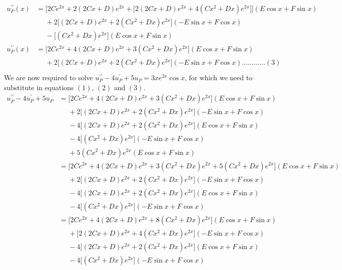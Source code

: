 \documentclass[a4paper]{article}
\newcommand{\ds}{\displaystyle}
\begin{document}
\begin{enumerate}
\begin{align*}
		u_P^{\prime\prime}(x) & = \Big[2Ce^{2x} + 2(2Cx+D)e^{2x} +\big[2(2Cx+D)e^{2x} + 4(Cx^2+Dx)e^{2x}\big] \Big](E\cos{x} + F\sin{x})\\
		& \phantom{{}={}} + 2\Big[(2Cx+D)e^{2x} + 2(Cx^2+Dx)e^{2x} \Big](-E\sin{x} + F\cos{x})\\
		& \phantom{{}={}} - \Big[(Cx^2+Dx)e^{2x} \Big](E\cos{x} + F\sin{x})\\
		u_P^{\prime\prime}(x) & = \Big[2Ce^{2x} + 4(2Cx+D)e^{2x} + 3(Cx^2+Dx)e^{2x} \Big](E\cos{x} + F\sin{x})\\
		& \phantom{{}={}} + 2\Big[(2Cx+D)e^{2x} + 2(Cx^2+Dx)e^{2x} \Big](-E\sin{x} + F\cos{x})\dots\dots\dots\dots(3)\\
	\end{align*}
	\pagebreak
	We are now required to solve $\ds{u_P^{\prime\prime} - 4u_P^{\prime} + 5u_P = 3xe^{2x}\cos{x}}$, for which we need to substitute in equations $\ds{(1)}$, $\ds{(2)}$ and $\ds{(3)}$.
	\begin{align*}
		u_P^{\prime\prime} - 4u_P^{\prime} + 5u_P & = \Big[2Ce^{2x} + 4(2Cx+D)e^{2x} + 3(Cx^2+Dx)e^{2x} \Big](E\cos{x} + F\sin{x})\\
		& \phantom{{}={}} + 2\Big[(2Cx+D)e^{2x} + 2(Cx^2+Dx)e^{2x} \Big](-E\sin{x} + F\cos{x})\\
		& \phantom{{}={}} - 4\Big[(2Cx + D)e^{2x} + 2(Cx^2 + Dx)e^{2x} \Big](E\cos{x} + F\sin{x})\\ 
		& \phantom{{}={}} - 4\Big[(Cx^2 + Dx)e^{2x} \Big](-E\sin{x} + F\cos{x})\\
		& \phantom{{}={}} + 5(Cx^2 + Dx)e^{2x}(E\cos{x} + F\sin{x})\\
		& = \Big[2Ce^{2x} + 4(2Cx+D)e^{2x} + 3(Cx^2+Dx)e^{2x} + 5(Cx^2 + Dx)e^{2x} \Big](E\cos{x} + F\sin{x})\\
		& \phantom{{}={}} + 2\Big[(2Cx+D)e^{2x} + 2(Cx^2+Dx)e^{2x} \Big](-E\sin{x} + F\cos{x})\\
		& \phantom{{}={}} - 4\Big[(2Cx + D)e^{2x} + 2(Cx^2 + Dx)e^{2x} \Big](E\cos{x} + F\sin{x})\\ 
		& \phantom{{}={}} - 4\Big[(Cx^2 + Dx)e^{2x} \Big](-E\sin{x} + F\cos{x})\\
		& = \Big[2Ce^{2x} + 4(2Cx+D)e^{2x} + 8(Cx^2+Dx)e^{2x} \Big](E\cos{x} + F\sin{x})\\
		& \phantom{{}={}} + \Big[2(2Cx+D)e^{2x} + 4(Cx^2+Dx)e^{2x} \Big](-E\sin{x} + F\cos{x})\\
		& \phantom{{}={}} - 4\Big[(2Cx + D)e^{2x} + 2(Cx^2 + Dx)e^{2x} \Big](E\cos{x} + F\sin{x})\\ 
		& \phantom{{}={}} - 4\Big[(Cx^2 + Dx)e^{2x} \Big](-E\sin{x} + F\cos{x})\\

\end{align*}
\end{enumerate}
\end{document}
